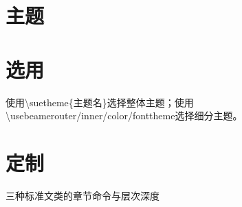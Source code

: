 \documentclass{book}%
\begin{document}
    \section{主题}
    
    \section{选用}
    使用\textbackslash suetheme\{主题名\}选择整体主题；使用\textbackslash usebeamerouter/inner/color/fonttheme选择细分主题。
    
    \section{定制}
    
    三种标准文类的章节命令与层次深度\\
\end{document}
